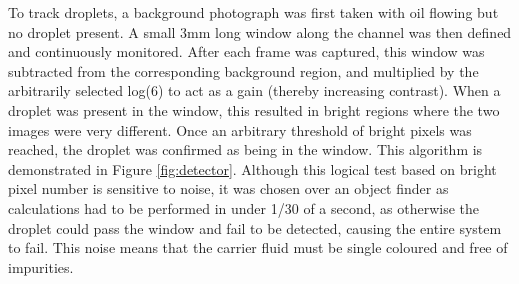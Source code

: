 \documentclass{physics_article_B}
\begin{document}
To track droplets, a background photograph was first taken with oil flowing but no droplet present. A small 3mm long window along the channel was then defined and continuously monitored. After each frame was captured, this window was subtracted from the corresponding background region, and multiplied by the arbitrarily selected log(6) to act as a gain (thereby increasing contrast). When a droplet was present in the window, this resulted in bright regions where the two images were very different. Once an arbitrary threshold of bright pixels was reached, the droplet was confirmed as being in the window. This algorithm is demonstrated in Figure \ref{fig:detector}. Although this logical test based on bright pixel number is sensitive to noise, it was chosen over an object finder as calculations had to be performed in under 1/30 of a second, as otherwise the droplet could pass the window and fail to be detected, causing the entire system to fail. This noise means that the carrier fluid must be single coloured and free of impurities. \\
\end{document}
